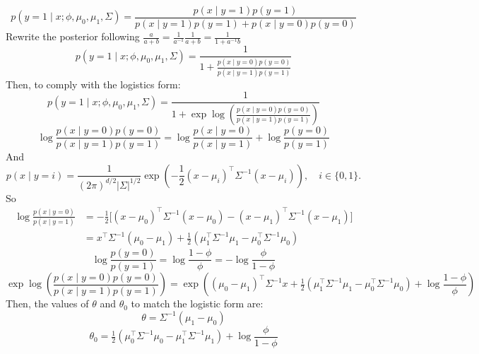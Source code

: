\begin{answer}

$$
p(y=1\mid x;\phi,\mu_0,\mu_1,\Sigma)
= \frac{p(x\mid y=1)p(y=1)}
       {p(x\mid y=1)p(y=1) + p(x\mid y=0)p(y=0)}
$$
Rewrite the posterior following $\frac{a}{a+b} = \frac{1}{a^{-1}} \frac{1}{a+b} = \frac{1}{1+a^{-1}b}$
$$
p(y=1\mid x;\phi,\mu_0,\mu_1,\Sigma)
= \frac{1}
       {1 + \frac{p(x\mid y=0)p(y=0)}{p(x\mid y=1)p(y=1)}}
$$
Then, to comply with the logistics form:
$$
p(y=1\mid x;\phi,\mu_0,\mu_1,\Sigma)
= \frac{1}
       {1 + \exp \log \left( \frac{p(x\mid y=0)p(y=0)}{p(x\mid y=1)p(y=1)} \right)}
$$
$$
\log\frac{p(x\mid y=0)p(y=0)}{p(x\mid y=1)p(y=1)}
= \log \frac{p(x\mid y=0)}{p(x\mid y=1)}
+ \log \frac{p(y=0)}{p(y=1)}
$$
And
$$
p(x\mid y=i)
= \frac{1}{(2\pi)^{d/2}|\Sigma|^{1/2}}
  \exp\!\left(-\frac12(x-\mu_i)^{\top}\Sigma^{-1}(x-\mu_i)\right),
  \quad i\in\{0,1\}.
$$
So
$$
\begin{align}
\log \frac{p(x\mid y=0)}{p(x\mid y=1)}
&= -\frac{1}{2}\Big[
(x-\mu_0)^{\top}\Sigma^{-1}(x-\mu_0)
- (x-\mu_1)^{\top}\Sigma^{-1}(x-\mu_1)
\Big] \\
&= x^{\top}\Sigma^{-1}(\mu_0-\mu_1)
   + \tfrac{1}{2}(\mu_1^{\top}\Sigma^{-1}\mu_1 - \mu_0^{\top}\Sigma^{-1}\mu_0)
\end{align}
$$
$$
\log \frac{p(y=0)}{p(y=1)} = \log \frac{1-\phi}{\phi} = - \log \frac{\phi}{1-\phi}
$$
$$
\exp \log \left( \frac{p(x\mid y=0)p(y=0)}{p(x\mid y=1)p(y=1)} \right)
= \exp \left(
(\mu_0-\mu_1)^{\top}\Sigma^{-1}x
   + \tfrac{1}{2}(\mu_1^{\top}\Sigma^{-1}\mu_1 - \mu_0^{\top}\Sigma^{-1}\mu_0)
+ \log \frac{1-\phi}{\phi}
\right)
$$
Then, the values of $\theta$ and $\theta_{0}$ to match the logistic form are:
$$
\boxed{
\theta = \Sigma^{-1}(\mu_{1}-\mu_{0})
}
$$
$$
\boxed{
\theta_{0} 
= \tfrac{1}{2}(\mu_0^{\top}\Sigma^{-1}\mu_0 - \mu_1^{\top}\Sigma^{-1}\mu_1)
+ \log \frac{\phi}{1-\phi}
}
$$
\end{answer}
